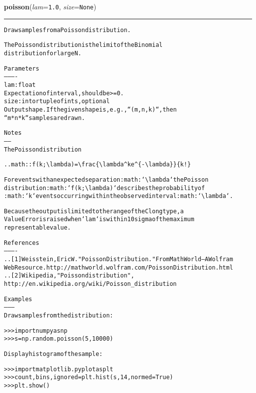 \hspace{.8\funcindent}\begin{boxedminipage}{\funcwidth}

    \raggedright \textbf{poisson}(\textit{lam}={\tt 1.0}, \textit{size}={\tt None})

    \vspace{-1.5ex}

    \rule{\textwidth}{0.5\fboxrule}
\setlength{\parskip}{2ex}
\begin{alltt}
Draw samples from a Poisson distribution.

The Poisson distribution is the limit of the Binomial
distribution for large N.

Parameters
----------
lam : float
    Expectation of interval, should be {\textgreater}= 0.
size : int or tuple of ints, optional
    Output shape. If the given shape is, e.g., ``(m, n, k)``, then
    ``m * n * k`` samples are drawn.

Notes
-----
The Poisson distribution

.. math:: f(k; {\textbackslash}lambda)={\textbackslash}frac\{{\textbackslash}lambda{\textasciicircum}k e{\textasciicircum}\{-{\textbackslash}lambda\}\}\{k!\}

For events with an expected separation :math:`{\textbackslash}lambda` the Poisson
distribution :math:`f(k; {\textbackslash}lambda)` describes the probability of
:math:`k` events occurring within the observed interval :math:`{\textbackslash}lambda`.

Because the output is limited to the range of the C long type, a
ValueError is raised when `lam` is within 10 sigma of the maximum
representable value.

References
----------
.. [1] Weisstein, Eric W. "Poisson Distribution." From MathWorld--A Wolfram
       Web Resource. http://mathworld.wolfram.com/PoissonDistribution.html
.. [2] Wikipedia, "Poisson distribution",
   http://en.wikipedia.org/wiki/Poisson\_distribution

Examples
--------
Draw samples from the distribution:

{\textgreater}{\textgreater}{\textgreater} import numpy as np
{\textgreater}{\textgreater}{\textgreater} s = np.random.poisson(5, 10000)

Display histogram of the sample:

{\textgreater}{\textgreater}{\textgreater} import matplotlib.pyplot as plt
{\textgreater}{\textgreater}{\textgreater} count, bins, ignored = plt.hist(s, 14, normed=True)
{\textgreater}{\textgreater}{\textgreater} plt.show()
\end{alltt}

\setlength{\parskip}{1ex}
    \end{boxedminipage}


